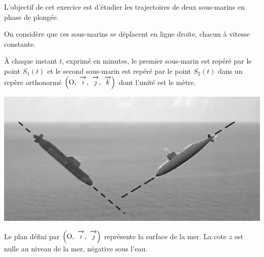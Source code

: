 \documentclass[10pt,a4paper]{article}
\newcommand{\vect}[1]{\overrightarrow{\,\mathstrut#1\,}}
\def\Oij{$\left(\text{O},~\vect{\imath},~\vect{\jmath}\right)$}
\def\Oijk{$\left(\text{O},~\vect{\imath},~\vect{\jmath},~\vect{k}\right)$}
\begin{document}
\begin{minipage}{0.5\linewidth}
L'objectif de cet exercice est d'étudier les trajectoires de deux sous-marins en phase de plongée.

On considère que ces sous-marins se déplacent en ligne droite, chacun à vitesse constante.

À chaque instant $t$, exprimé en minutes, le premier sous-marin est repéré par le point $S_1(t)$ et le second
sous-marin est repéré par le point $S_2(t)$ dans un repère orthonormé \Oijk{} dont l'unité est le mètre.
\end{minipage} \hfill
\begin{minipage}{0.47\linewidth}
\begin{flushright}
\includegraphics[scale=0.6]{Exo3_1}
\end{flushright}
\end{minipage}

Le plan défini par \Oij{} représente la surface de la mer. La cote $z$ est nulle au niveau de la
mer, négative sous l'eau.

\medskip
\end{document}
